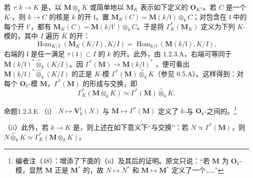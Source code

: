 若 $\tau:k\to K$ 是，以 $\mathbf M\otimes_k K$ 或简单地以 $\mathbf M_K$ 表示如下定义的 $\mathbf O_K$-。若 $C$ 是一个 $K$-，则 $k\to C$ 的核是 $k$ 的开 $\mathfrak l$，置 $\mathbf M_K(C)=\mathbf M(k/\mathfrak l)\otimes_k C$；对包含在 $\mathfrak l$ 中的每个开 $\mathfrak l'$，都有 $\mathbf M_K(C)=\mathbf M(k/\mathfrak l')\otimes_k C$。于是将 $\Gamma_K^*(\mathbf M_K)$ 定义为下列 $K$-模的，其中 $I$ 遍历 $K$ 的开：
\[
 \operatorname{Hom}_{K/I}(\mathbf M_K(K/I),K/I)=\operatorname{Hom}_{k/\mathfrak l}(\mathbf M(k/\mathfrak l),K/I),
\]
右端的 $\mathfrak l$ 是任一满足 $\tau(\mathfrak l)\subset I$ 的 $k$ 的开。此外，由 1.2.3.A，右端可等同于 $\mathbf M(k/\mathfrak l)^*\widehat\otimes_k(K/I)$。因 $\Gamma^*(\mathbf M)\to\mathbf M(k/\mathfrak l)^*$ ，便可看出 $\mathbf M(k/\mathfrak l)^*\widehat\otimes_k(K/I)$ 的正是 $K$-模 $\Gamma^*(\mathbf M)\widehat\otimes_k K$（参见 0.5.A）。这样得到：对每个 $\mathbf O_k$-模 $\mathbf M$，$\Gamma^*(\mathbf M)$ 的形成与交换，即
\[
 \Gamma_K^*(\mathbf M\otimes_k K)\simeq\Gamma^*(\mathbf M)\widehat\otimes_k K.\tag{$\star$}
\]
\begin{SGAresult}{命题}{1.2.3.E}
（i） $N\mapsto\mathbf V_k^{\mathrm f}(N)$ 与 $\mathbf M\mapsto\Gamma^*(\mathbf M)$ 定义了 $k$-与 $\mathbf O_k$-之间的。\footnote{编者注（48）：增添了下面的（ii）及其后的证明。原文只说：“若 $\mathbf M$ 为 $\mathbf O_k$-模，显然 $\mathbf M$ 正是 $\mathbf M^*$ 的，故 $N\mapsto N^*$ 和 $\mathbf M\mapsto\mathbf M^*$ 定义了一个……”}

（ii）此外，若 $k\to K$ 是，则上述在如下意义下“与交换”：若 $N\simeq\Gamma^*(\mathbf M)$，则 $N\widehat\otimes_k K\simeq\Gamma_K^*(\mathbf M\otimes_k K)$。
\end{SGAresult}
